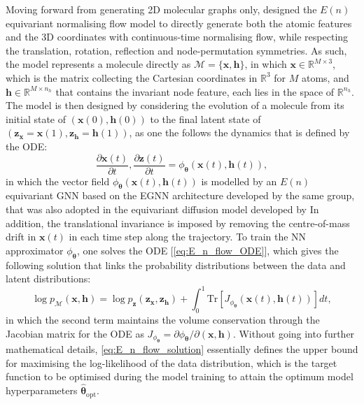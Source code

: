 Moving forward from generating 2D molecular graphs only, \citet{Garcia_e_n_generative} designed the $E(n)$ equivariant normalising flow model to directly generate both the atomic features and the 3D coordinates with continuous-time normalising flow, while respecting the translation, rotation, reflection and node-permutation symmetries.  
As such, the model represents a molecule directly as $\mathcal{M}=\{\bm{x},\bm{h}\}$, in which $\bm{x}\in\mathbb{R}^{M\times 3}$, which is the matrix collecting the Cartesian coordinates in $\mathbb{R}^3$ for $M$ atoms, and $\bm{h}\in \mathbb{R}^{M\times n_h}$ that contains the invariant node feature, each lies in the space of $\mathbb{R}^{n_h}$. The model is then designed by considering the evolution of a molecule from its initial state of $(\bm{x}(0),\bm{h}(0))$ to the final latent state of $(\bm{z}_{\bm{x}}=\bm{x}(1),\bm{z}_{\bm{h}}=\bm{h}(1))$, as one the follows the dynamics that is defined by the ODE:
\begin{equation}
    \label{eq:E_n_flow_ODE}
    \frac{\partial\bm{x}(t)}{\partial t},\frac{\partial\bm{z}(t)}{\partial t}=\phi_{\boldsymbol{\theta}}(\bm{x}(t),\bm{h}(t)),
\end{equation}
in which the vector field $\phi_{\boldsymbol{\theta}}(\bm{x}(t),\bm{h}(t))$ is modelled by an $E(n)$ equivariant GNN based on the EGNN\cite{satorras2021n} architecture developed by the same group, that was also adopted in the equivariant diffusion model developed by \citet{hoogeboom2022equivariant} In addition, the translational invariance is imposed by removing the centre-of-mass drift in $\bm{x}(t)$ in each time step along the trajectory. To train the NN approximator $\phi_{\boldsymbol{\theta}}$, one solves the ODE [\cref{eq:E_n_flow_ODE}], which gives the following solution that links the probability distributions between the data and latent distributions:
\begin{equation}
    \label{eq:E_n_flow_solution}
    \log p_{\mathcal{M}}(\bm{x},\bm{h})= \log p_\bm{z}(\bm{z}_{\bm{x}},\bm{z}_{\bm{h}})+\int_0^1 \mathrm{Tr} \left[  J_{\phi_{\boldsymbol{\theta}}} (\bm{x}(t),\bm{h}(t)) \right]dt,
\end{equation}
in which the second term maintains the volume conservation through the Jacobian matrix for the ODE as $J_{\phi_{\boldsymbol{\theta}}}=\partial \phi_{\boldsymbol{\theta}}/\partial(\bm{x},\bm{h}) $. Without going into further mathematical details, \cref{eq:E_n_flow_solution} essentially defines the upper bound for maximising the log-likelihood of the data distribution, which is the target function to be optimised during the model training to attain the optimum model hyperparameters $\hat{\boldsymbol{\theta}}_{\mathrm{opt}}$.

